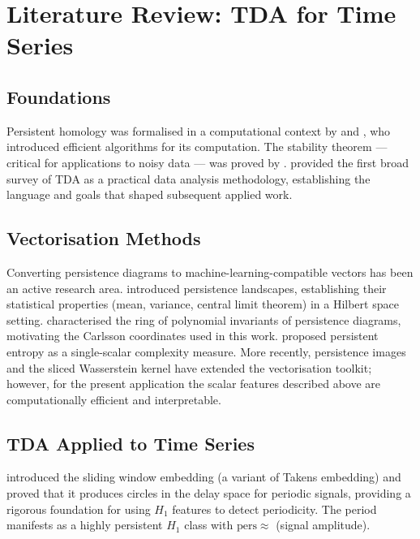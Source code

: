 \documentclass[12pt, a4paper]{article}
\theoremstyle{definition}
\theoremstyle{plain}
\newcommand{\pers}{\mathrm{pers}}
\begin{document}
\section{Literature Review: TDA for Time Series}
\label{sec:tda_literature}

\subsection{Foundations}

Persistent homology was formalised in a computational context by
\citet{edelsbrunner2000topological} and
\citet{zomorodian2005computing}, who introduced efficient algorithms for its
computation. The stability theorem --- critical for applications to noisy data ---
was proved by \citet{cohen-steiner2007stability}.
\citet{carlsson2009topology} provided the first broad survey of TDA as a practical
data analysis methodology, establishing the language and goals that shaped subsequent
applied work.

\subsection{Vectorisation Methods}

Converting persistence diagrams to machine-learning-compatible vectors has been an
active research area. \citet{bubenik2015statistical} introduced persistence
landscapes, establishing their statistical properties (mean, variance, central limit
theorem) in a Hilbert space setting. \citet{adcock2016ring} characterised the ring
of polynomial invariants of persistence diagrams, motivating the Carlsson coordinates
used in this work. \citet{chintakunta2015entropy} proposed persistent entropy as a
single-scalar complexity measure. More recently, persistence images
\citep{adams2017persistence} and the sliced Wasserstein kernel
\citep{carriere2017sliced} have extended the vectorisation toolkit; however, for
the present application the scalar features described above are computationally
efficient and interpretable.

\subsection{TDA Applied to Time Series}

\citet{perea2015sliding} introduced the sliding window embedding (a variant of
Takens embedding) and proved that it produces circles in the delay space for
periodic signals, providing a rigorous foundation for using $H_1$ features to
detect periodicity. The period manifests as a highly persistent $H_1$ class with
$\pers \approx$ (signal amplitude).
\end{document}
